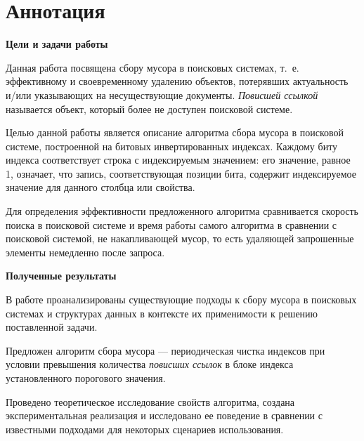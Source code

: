 \newpage
\section*{Аннотация}

\textbf{Цели и задачи работы}

Данная работа посвящена сбору мусора в поисковых системах, т.~е. эффективному и
своевременному удалению объектов, потерявших актуальность и/или указывающих на
несуществующие документы. \textit{Повисшей ссылкой} называется объект, который
более не доступен поисковой системе.

Целью данной работы является описание алгоритма сбора мусора в поисковой системе,
построенной на битовых инвертированных индексах. Каждому биту индекса
соответствует строка с индексируемым значением: его значение, равное 1, означает,
что запись, соответствующая позиции бита, содержит индексируемое значение для
данного столбца или свойства.

Для определения эффективности предложенного алгоритма сравнивается скорость
поиска в поисковой системе и время работы самого алгоритма в сравнении с
поисковой системой, не накапливающей мусор, то есть удаляющей запрошенные
элементы немедленно после запроса.

\textbf{Полученные результаты}

В работе проанализированы существующие подходы к сбору мусора в поисковых
системах и структурах данных в контексте их применимости к решению поставленной
задачи.

Предложен алгоритм сбора мусора --- периодическая чистка индексов при условии
превышения количества \textit{повисших ссылок} в блоке индекса установленного
порогового значения.

Проведено теоретическое исследование свойств алгоритма, создана экспериментальная
реализация и исследовано ее поведение в сравнении с известными подходами для
некоторых сценариев использования.
